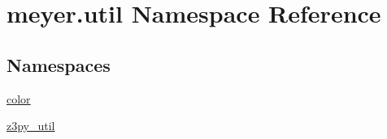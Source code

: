 \hypertarget{namespacemeyer_1_1util}{}\section{meyer.\+util Namespace Reference}
\label{namespacemeyer_1_1util}
\subsection*{Namespaces}
\begin{DoxyCompactItemize}
\item 
 \hyperlink{namespacemeyer_1_1util_1_1color}{color}
\item 
 \hyperlink{namespacemeyer_1_1util_1_1z3py__util}{z3py\+\_\+util}
\end{DoxyCompactItemize}
